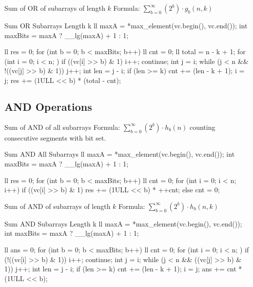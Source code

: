 \documentclass[10pt]{article}
\newcommand{\complexity}[1]{%
  \tcbox[on line,
    colback=tagbg,
    colframe=tagbg,
    boxrule=0pt,
    arc=2pt,
    boxsep=0pt,
    left=3.5pt, right=3.5pt, top=1.5pt, bottom=1.5pt
  ]{\color{tagtext}\scriptsize\bfseries\ensuremath{#1}}%
}
\begin{document}
\begin{conceptbox}{Sum of OR of subarrays of length $k$}
    Formula: $\sum_{b = 0}^{\infty} (2^b) \cdot g_b(n, k)$
\end{conceptbox}

\begin{vscode}{Sum OR Subarrays Length k \complexity{O(N \log(\max A))}}
ll maxA = *max_element(vc.begin(), vc.end());
int maxBits = maxA ? __lg(maxA) + 1 : 1;

ll res = 0;
for (int b = 0; b < maxBits; b++) 
{
    ll cnt = 0;
    ll total = n - k + 1;
    for (int i = 0; i < n; ) 
    {
        if ((vc[i] >> b) & 1) 
        { 
            i++; 
            continue; 
        }
        int j = i;
        while (j < n && !((vc[j] >> b) & 1)) 
            j++;
        int len = j - i;
        if (len >= k) 
            cnt += (len - k + 1);
        i = j;
    }
    res += (1ULL << b) * (total - cnt);
}
\end{vscode}
\newpage
\subsection{AND Operations}

\begin{conceptbox}{Sum of AND of all subarrays}
    Formula: $\sum_{b = 0}^{\infty} (2^b) \cdot h_b(n)$ counting consecutive segments with bit set.
\end{conceptbox}

\begin{vscode}{Sum AND All Subarrays \complexity{O(N \log(\max A))}}
ll maxA = *max_element(vc.begin(), vc.end());
int maxBits = maxA ? __lg(maxA) + 1 : 1;

ll res = 0;
for (int b = 0; b < maxBits; b++) 
{
    ll cnt = 0;
    for (int i = 0; i < n; i++) 
    {
        if ((vc[i] >> b) & 1) 
            res += (1ULL << b) * ++cnt;
        else 
            cnt = 0;
    }
}
\end{vscode}

\begin{conceptbox}{Sum of AND of subarrays of length $k$}
    Formula: $\sum_{b = 0}^{\infty} (2^b) \cdot h_b(n, k)$
\end{conceptbox}

\begin{vscode}{Sum AND Subarrays Length k \complexity{O(N \log(\max A))}}
ll maxA = *max_element(vc.begin(), vc.end());
int maxBits = maxA ? __lg(maxA) + 1 : 1;

ll ans = 0;
for (int b = 0; b < maxBits; b++) 
{
    ll cnt = 0;
    for (int i = 0; i < n; ) 
    {
        if (!((vc[i] >> b) & 1)) 
        { 
            i++; 
            continue; 
        }
        int j = i;
        while (j < n && ((vc[j] >> b) & 1)) 
            j++;
        int len = j - i;
        if (len >= k) 
            cnt += (len - k + 1);
        i = j;
    }
    ans += cnt * (1ULL << b);
}
\end{vscode}
\end{document}
